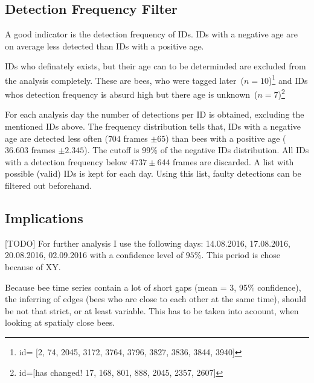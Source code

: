 \subsection{Detection Frequency Filter}
A good indicator is the detection frequency of IDs. IDs with a negative age are on average less detected than IDs with a positive age.

IDs who definately exists, but their age can to be determinded are excluded from the analysis completely. These are bees, who were tagged later~($n=10$)\footnote{id= [2,
	74,
	2045,
	3172,
	3764,
	3796,
	3827,
	3836,
	3844,
	3940]} and IDs whos detection frequency is absurd high but there age is unknown~($n=7$)\footnote{id=[has changed! 
	17,
	168,
	801,
	888,
	2045,
	2357,
	2607]}

For each analysis day the number of detections per ID is obtained, excluding the mentioned IDs above. The frequency distribution tells that, IDs with a negative age are detected less often ($704$ frames $\pm 65$)  than bees with a positive age ($36.603$ frames $\pm 2.345$). The cutoff is 99\% of the negative IDs distribution. All IDs with a detection frequency below $4737 \pm 644$ frames are discarded. A list with possible (valid) IDs is kept for each day. Using this list, faulty detections can be filtered out beforehand.

\clearpage
\subsection{Implications}
[TODO]
For further analysis I use the following days: 14.08.2016, 17.08.2016, 20.08.2016, 02.09.2016 with a confidence level of $95\%$. This period is chose because of XY.

Because bee time series contain a lot of short gaps (mean = 3, 95\% confidence), the inferring of edges (bees who are close to each other at the same time), should be not that strict, or at least variable. This has to be taken into acoount, when looking at spatialy close bees.